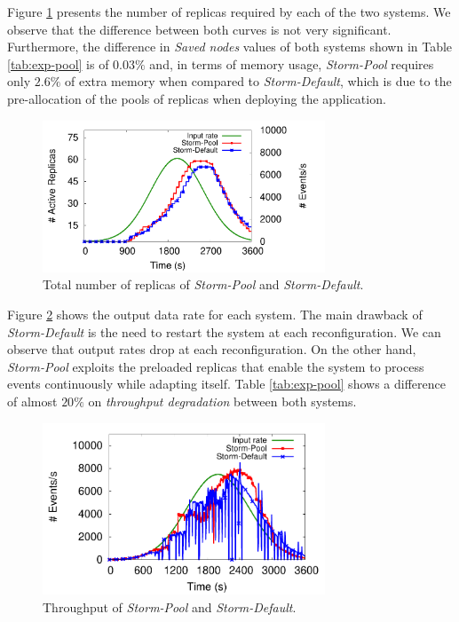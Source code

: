 Figure \ref{fig:exp-pool-replicas} presents the number of replicas required by each of the two systems. We observe that the difference between both curves is not very significant. Furthermore, the difference in \textit{Saved nodes}  values of both systems shown in  Table \ref{tab:exp-pool} is of $0.03\%$ and, in terms of  memory usage, \textit{Storm-Pool} requires only $2.6\%$ of extra memory when compared to \textit{Storm-Default}, which is due to the pre-allocation of the pools of replicas when deploying the application.

\begin{figure}[!ht]
    \centering
    \includegraphics[width=0.75\textwidth]{figures/exp/storm/Pool-Replicas.pdf}
    \caption{Total number of replicas of \textit{Storm-Pool} and \textit{Storm-Default}.}
    \label{fig:exp-pool-replicas}
\end{figure}

Figure \ref{fig:exp-pool-throughput} shows the output data rate for each system. The main drawback of \textit{Storm-Default} is the need to restart the system at each reconfiguration. We can observe that output rates drop at each reconfiguration.
On the other hand, \textit{Storm-Pool} exploits the preloaded replicas that enable the system to process events continuously while adapting itself. Table \ref{tab:exp-pool} shows a difference of almost $20\%$ on \textit{throughput degradation} between both systems.

\begin{figure}[!ht]
    \centering
    \includegraphics[width=0.75\textwidth]{figures/exp/storm/Pool-Throughput.pdf}
    \caption{Throughput of \textit{Storm-Pool} and \textit{Storm-Default}.}
    \label{fig:exp-pool-throughput}
\end{figure}

